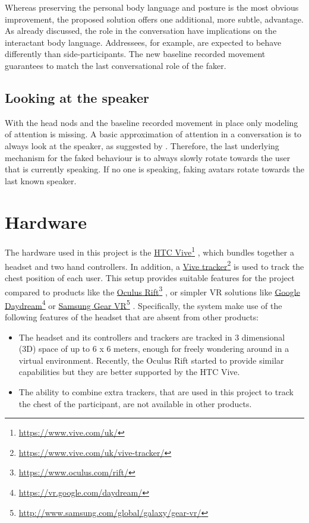 \documentclass[]{simple-thesis}
\newcommand\fnurl[2]{%
  \href{#2}{#1}\footnote{\url{#2}}%
}
\begin{document}
Whereas preserving the personal body language and posture is the most obvious improvement, the proposed solution offers one additional, more subtle, advantage.
As already discussed, the role in the conversation have implications on the interactant body language.
Addressees, for example, are expected to behave differently than side-participants.
The new baseline recorded movement guarantees to match the last conversational role of the faker.

\subsection{Looking at the speaker}

With the head nods and the baseline recorded movement in place only modeling of attention is missing.
A basic approximation of attention in a conversation is to always look at the speaker, as suggested by \cite{Fujie2009}.
Therefore, the last underlying mechanism for the faked behaviour is to always slowly rotate towards the user that is currently speaking.
If no one is speaking, faking avatars rotate towards the last known speaker.

\section{Hardware}

The hardware used in this project is the \fnurl{HTC Vive}{https://www.vive.com/uk/}, which bundles together a headset and two hand controllers.
In addition, a \fnurl{Vive tracker}{https://www.vive.com/uk/vive-tracker/} is used to track the chest position of each user.
This setup provides suitable features for the project compared to products like the \fnurl{Oculus Rift}{https://www.oculus.com/rift/}, or simpler VR solutions like \fnurl{Google Daydream}{https://vr.google.com/daydream/} or \fnurl{Samsung Gear VR}{http://www.samsung.com/global/galaxy/gear-vr/}.
Specifically, the system make use of the following features of the headset that are absent from other products:

\begin{itemize}
  \item The headset and its controllers and trackers are tracked in 3 dimensional (3D) space of up to 6 x 6 meters, enough for freely wondering around in a virtual environment. Recently, the Oculus Rift started to provide similar capabilities but they are better supported by the HTC Vive.
  \item The ability to combine extra trackers, that are used in this project to track the chest of the participant, are not available in other products.
\end{itemize}
\end{document}
